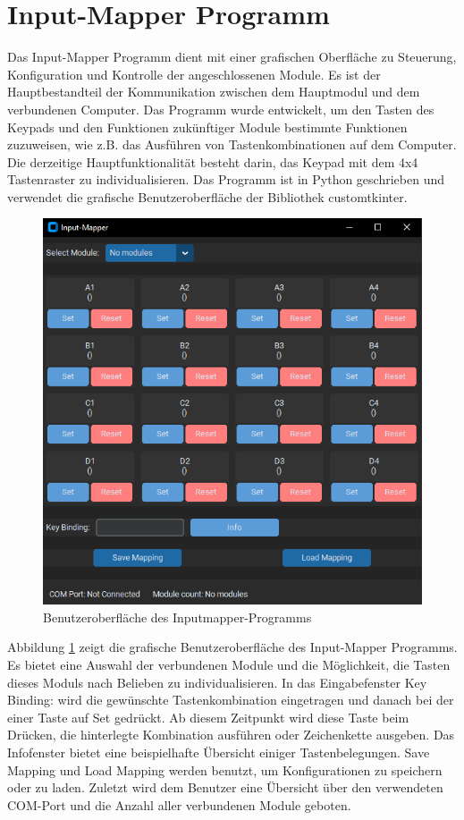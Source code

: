 \section{Input-Mapper Programm}
Das Input-Mapper Programm dient mit einer grafischen Oberfläche zu Steuerung, Konfiguration und Kontrolle der angeschlossenen Module. Es ist der Hauptbestandteil der Kommunikation zwischen dem Hauptmodul und dem verbundenen Computer. Das Programm wurde entwickelt, um den Tasten des Keypads und den Funktionen zukünftiger Module bestimmte Funktionen zuzuweisen, wie z.B. das Ausführen von Tastenkombinationen auf dem Computer. Die derzeitige Hauptfunktionalität besteht darin, das Keypad mit dem 4x4 Tastenraster zu individualisieren. Das Programm ist in Python geschrieben und verwendet die grafische Benutzeroberfläche der Bibliothek \glqq customtkinter\grqq.


\begin{figure}[H]
	\centering    
	\includegraphics[width=.8\textwidth]{Bilder/mapper.png}
	\caption{Benutzeroberfläche des Inputmapper-Programms}
	\label{Mapper_ui}
\end{figure}
Abbildung \ref{Mapper_ui} zeigt die grafische Benutzeroberfläche des Input-Mapper Programms. Es bietet eine Auswahl der verbundenen Module und die Möglichkeit, die Tasten dieses Moduls nach Belieben zu individualisieren. In das Eingabefenster \glqq Key Binding:\grqq{} wird die gewünschte Tastenkombination eingetragen und danach bei der einer Taste auf \glqq Set\grqq{} gedrückt. Ab diesem Zeitpunkt wird diese Taste beim Drücken, die hinterlegte Kombination ausführen oder Zeichenkette ausgeben. Das Infofenster bietet eine beispielhafte Übersicht einiger Tastenbelegungen. \glqq Save Mapping\grqq{} und \glqq Load Mapping\grqq{} werden benutzt, um Konfigurationen zu speichern oder zu laden. Zuletzt wird dem Benutzer eine Übersicht über den verwendeten COM-Port und die Anzahl aller verbundenen Module geboten.


